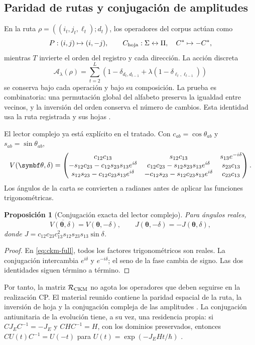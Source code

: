 \documentclass[11pt,a4paper]{article}
\numberwithin{equation}{section}
\newtheorem{proposition}[theorem]{Proposición}
\theoremstyle{definition}
\begin{document}
\subsection{Paridad de rutas y conjugación de amplitudes}
En la ruta $\rho=((i_t,j_t,\ell_t);d_t)$, los operadores del corpus
actúan como
\[
P:(i,j)\mapsto(i,-j),\qquad
C_{\rm hoja}:\Sigma\leftrightarrow\Pi,\quad C^*\mapsto-C^*,
\]
mientras $T$ invierte el orden del registro y cada dirección.
La acción discreta
\[
\mathcal A_\lambda(\rho)
=\sum_{t=2}^L\left(
1-\delta_{d_t,d_{t-1}}
+\lambda(1-\delta_{\ell_t,\ell_{t-1}})\right)
\]
se conserva bajo cada operación y bajo su composición.
La prueba es combinatoria: una permutación global del alfabeto preserva
la igualdad entre vecinos, y la inversión del orden conserva el número
de cambios. Esta identidad usa la ruta registrada y sus hojas
\cite{cpt}.

El lector complejo ya está explícito en el tratado. Con
$c_{ab}=\cos\theta_{ab}$ y $s_{ab}=\sin\theta_{ab}$,
\begin{equation}
\resizebox{\linewidth}{!}{$\displaystyle
V(\symbf\theta,\delta)=
\begin{pmatrix}
c_{12}c_{13}&s_{12}c_{13}&s_{13}e^{-i\delta}\\
-s_{12}c_{23}-c_{12}s_{23}s_{13}e^{i\delta}&
c_{12}c_{23}-s_{12}s_{23}s_{13}e^{i\delta}&s_{23}c_{13}\\
s_{12}s_{23}-c_{12}c_{23}s_{13}e^{i\delta}&
-c_{12}s_{23}-s_{12}c_{23}s_{13}e^{i\delta}&c_{23}c_{13}
\end{pmatrix}.$}
\label{eq:ckm-full}
\end{equation}
Los ángulos de la carta se convierten a radianes antes de aplicar
las funciones trigonométricas.

\begin{proposition}[Conjugación exacta del lector complejo]
Para ángulos reales,
\[
\overline{V(\symbf\theta,\delta)}
=V(\symbf\theta,-\delta),\qquad
J(\symbf\theta,-\delta)=-J(\symbf\theta,\delta),
\]
donde
$J=c_{12}c_{23}c_{13}^2s_{12}s_{23}s_{13}\sin\delta$.
\end{proposition}
\begin{proof}
En \eqref{eq:ckm-full}, todos los factores trigonométricos son reales.
La conjugación intercambia $e^{i\delta}$ y $e^{-i\delta}$; el seno
de la fase cambia de signo. Las dos identidades siguen término a término.
\end{proof}

Por tanto, la matriz $\mathcal R_{\rm CKM}$ no agota los operadores
que deben seguirse en la realización CP. El material reunido contiene
la paridad espacial de la ruta, la inversión de hoja y la conjugación
compleja de las amplitudes \cite{mezcla}. La conjugación antiunitaria
de la evolución tiene, a su vez, una residencia propia: si
$CJ_EC^{-1}=-J_E$ y $CHC^{-1}=H$, con los dominios preservados,
entonces $CU(t)C^{-1}=U(-t)$ para
$U(t)=\exp(-J_EHt/\hbar)$ \cite{conjugacion}.
\end{document}
